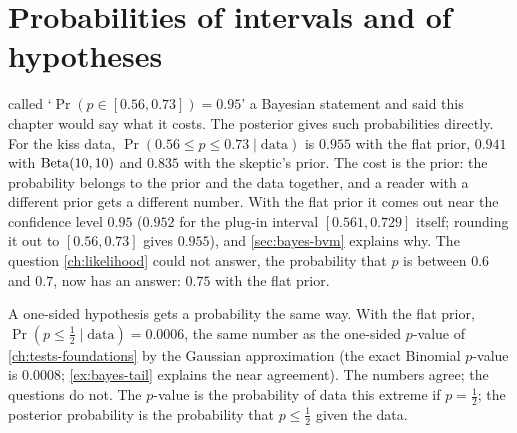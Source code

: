 \section{Probabilities of intervals and of hypotheses}
\label{sec:bayes-hypotheses}

 called `$\Pr(p \in [0.56, 0.73]) = 0.95$' a Bayesian statement and said this chapter would say what it costs.
The posterior gives such probabilities directly.
For the kiss data, $\Pr(0.56 \leq p \leq 0.73 \mid \text{data})$ is $0.955$ with the flat prior, $0.941$ with $\mathrm{Beta}(10, 10)$ and $0.835$ with the skeptic's prior.
The cost is the prior: the probability belongs to the prior and the data together, and a reader with a different prior gets a different number.
With the flat prior it comes out near the confidence level $0.95$ ($0.952$ for the plug-in interval $[0.561, 0.729]$ itself; rounding it out to $[0.56, 0.73]$ gives $0.955$), and \cref{sec:bayes-bvm} explains why.
The question \cref{ch:likelihood} could not answer, the probability that $p$ is between $0.6$ and $0.7$, now has an answer: $0.75$ with the flat prior.

A one-sided hypothesis gets a probability the same way.
With the flat prior, $\Pr(p \leq \frac12 \mid \text{data}) = 0.0006$, the same number as the one-sided $p$-value of \cref{ch:tests-foundations} by the Gaussian approximation (the exact Binomial $p$-value is $0.0008$; \cref{ex:bayes-tail} explains the near agreement).
The numbers agree; the questions do not.
The $p$-value is the probability of data this extreme if $p = \frac12$; the posterior probability is the probability that $p \leq \frac12$ given the data.

